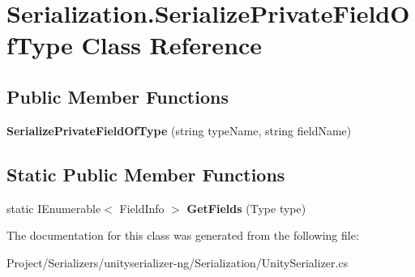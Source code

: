 \hypertarget{class_serialization_1_1_serialize_private_field_of_type}{}\section{Serialization.\+Serialize\+Private\+Field\+Of\+Type Class Reference}
\label{class_serialization_1_1_serialize_private_field_of_type}
\subsection*{Public Member Functions}
\begin{DoxyCompactItemize}
\item 
\mbox{\label{class_serialization_1_1_serialize_private_field_of_type_aec3524519e8f181567a7891eed967ae5}} 
{\bfseries Serialize\+Private\+Field\+Of\+Type} (string type\+Name, string field\+Name)
\end{DoxyCompactItemize}
\subsection*{Static Public Member Functions}
\begin{DoxyCompactItemize}
\item 
\mbox{\label{class_serialization_1_1_serialize_private_field_of_type_a1354bf6675fc61e5fc953edc95a61d96}} 
static I\+Enumerable$<$ Field\+Info $>$ {\bfseries Get\+Fields} (Type type)
\end{DoxyCompactItemize}


The documentation for this class was generated from the following file\+:\begin{DoxyCompactItemize}
\item 
Project/\+Serializers/unityserializer-\/ng/\+Serialization/Unity\+Serializer.\+cs\end{DoxyCompactItemize}
